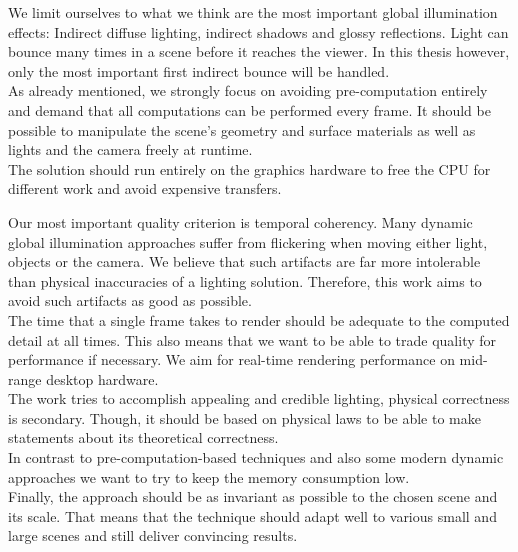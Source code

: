 \documentclass[thesis.tex]{subfiles}
\begin{document}
We limit ourselves to what we think are the most important global illumination effects: Indirect diffuse lighting, indirect shadows and glossy reflections.
Light can bounce many times in a scene before it reaches the viewer.
In this thesis however, only the most important first indirect bounce will be handled.
\\
As already mentioned, we strongly focus on avoiding pre-computation entirely and demand that all computations can be performed every frame.
It should be possible to manipulate the scene's geometry and surface materials as well as lights and the camera freely at runtime.
\\
The solution should run entirely on the graphics hardware to free the CPU for different work and avoid expensive transfers.

Our most important quality criterion is temporal coherency.
Many dynamic global illumination approaches suffer from flickering when moving either light, objects or the camera.
We believe that such artifacts are far more intolerable than physical inaccuracies of a lighting solution.
Therefore, this work aims to avoid such artifacts as good as possible.
\\
The time that a single frame takes to render should be adequate to the computed detail at all times.
This also means that we want to be able to trade quality for performance if necessary.
We aim for real-time rendering performance on mid-range desktop hardware.
\\
The work tries to accomplish appealing and credible lighting, physical correctness is secondary.
Though, it should be based on physical laws to be able to make statements about its theoretical correctness.
\\
In contrast to pre-computation-based techniques and also some modern dynamic approaches we want to try to keep the memory consumption low.
\\
Finally, the approach should be as invariant as possible to the chosen scene and its scale. %
That means that the technique should adapt well to various small and large scenes and still deliver convincing results.


\end{document}
